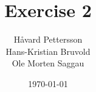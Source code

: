\newcommand{\mytitle}{Exercise 2}
\newcommand{\mygroupnumber}{12}
\newcommand{\myauthor}{Håvard Pettersson\\Hans-Kristian Bruvold\\Ole Morten Saggau}

\title{\mytitle}
\author{\myauthor}
\date{\today}
